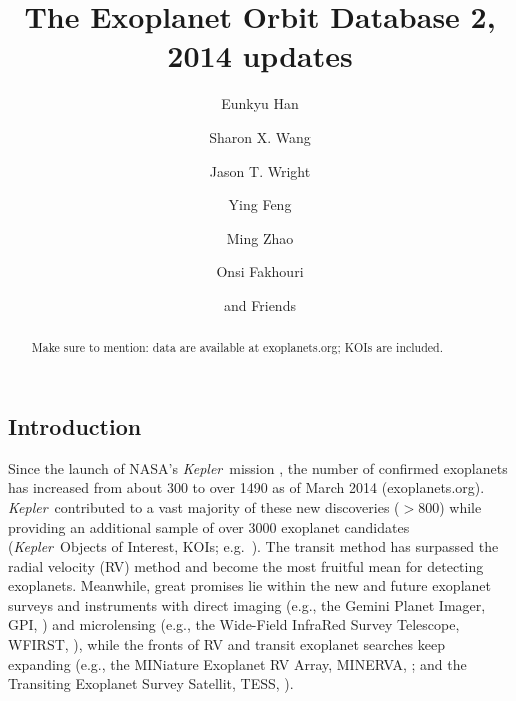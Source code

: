 \documentclass[11pt,preprint]{aastex}
\def\kepler{\textit{Kepler}}
\begin{document}
\begin{CJK*}{UTF8}{gbsn}

\title{The Exoplanet Orbit Database 2, 2014 updates}

\author{Eunkyu Han}
\author{Sharon X. Wang}
\author{Jason T. Wright}
\author{Ying Feng}
\author{Ming Zhao}
\author{Onsi Fakhouri}
\author{and Friends}



\begin{abstract}
Make sure to mention: data are available at exoplanets.org; KOIs are included.
\end{abstract}  

\section{Introduction}\label{sec:intro}

Since the launch of NASA's \kepler\ mission \citep{Borucki2010}, the
number of confirmed exoplanets has increased from about 300 to over
1490 as of March 2014 (exoplanets.org). \kepler\ contributed to a vast
majority of these new discoveries ($> 800$) while providing an
additional sample of over 3000 exoplanet candidates (\kepler\ Objects
of Interest, KOIs; e.g.~\citealt{Batalha2013}). The transit method has
surpassed the radial velocity (RV) method and become the most fruitful
mean for detecting exoplanets. Meanwhile, great promises lie within
the new and future exoplanet surveys and instruments with direct
imaging (e.g., the Gemini Planet Imager, GPI,
\citealt{Macintosh2014}) and microlensing (e.g., the Wide-Field
InfraRed Survey Telescope, WFIRST, \citealt{Green2012}), while the
fronts of RV and transit exoplanet searches keep expanding (e.g., the
MINiature Exoplanet RV Array, MINERVA, \citealt{Wright2014}; and the
Transiting Exoplanet Survey Satellit, TESS, \citealt{Ricker2010}).


\end{CJK*}
\end{document}

